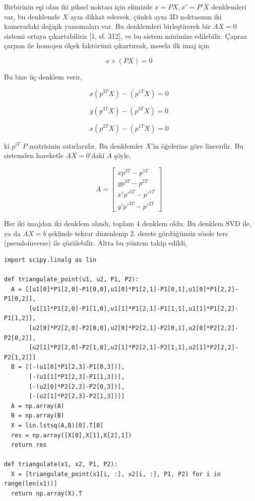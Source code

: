 \documentclass[12pt,fleqn]{article}\usepackage{../../common}
\begin{document}
Birbirinin eşi olan iki piksel noktası için elimizde $x = PX, x' = P'X$
denklemleri var, bu denklemde $X$ aynı dikkat edersek, çünkü aynı 3D
noktasının iki kameradaki değişik yansımaları var. Bu denklemleri
birleştirerek bir $AX=0$ sistemi ortaya çıkartabiliriz [1, sf. 312], ve bu
sistem minimize edilebilir. Çapraz çarpım ile homojen ölçek faktörünü
çıkartırsak, mesela ilk imaj için

$$ x \times (PX) = 0$$

Bu bize üç denklem verir, 

$$ x(p^{3T}X) - (p^{1T}X) = 0 $$

$$ y(p^{3T}X) - (p^{2T}X) = 0 $$

$$ x(p^{2T}X) - (p^{1T}X) = 0 $$

ki $p^{iT}$ $P$ matrisinin satırlarıdır. Bu denklemler $X$'in öğelerine göre
lineerdir. Bu sistemden hareketle $AX=0$'daki $A$ şöyle, 

$$ A = \left[\begin{array}{c}
xp^{3T} - p^{1T} \\ 
yp^{3T} - p^{2T} \\
x'p'^{3T} - p'^{1T} \\
y'p'^{3T} - p'^{2T} 
\end{array}\right]$$

Her iki imajdan iki denklem alındı, toplam 4 denklem oldu. Bu denklem SVD
ile, ya da $AX=b$ şeklinde tekrar düzenlenip 2. derste gördüğümüz sözde ters
(pseudoinverse) ile çözülebilir. Altta bu yöntem takip edildi,

\begin{verbatim}
import scipy.linalg as lin

def triangulate_point(u1, u2, P1, P2):
  A = [[u1[0]*P1[2,0]-P1[0,0],u1[0]*P1[2,1]-P1[0,1],u1[0]*P1[2,2]-P1[0,2]],
       [u1[1]*P1[2,0]-P1[1,0],u1[1]*P1[2,1]-P1[1,1],u1[1]*P1[2,2]-P1[1,2]],
       [u2[0]*P2[2,0]-P2[0,0],u2[0]*P2[2,1]-P2[0,1],u2[0]*P2[2,2]-P2[0,2]],
       [u2[1]*P2[2,0]-P2[1,0],u2[1]*P2[2,1]-P2[1,1],u2[1]*P2[2,2]-P2[1,2]]]
  B = [[-(u1[0]*P1[2,3]-P1[0,3])],
       [-(u1[1]*P1[2,3]-P1[1,3])],
       [-(u2[0]*P2[2,3]-P2[0,3])],
       [-(u2[1]*P2[2,3]-P2[1,3])]]
  A = np.array(A)
  B = np.array(B)
  X = lin.lstsq(A,B)[0].T[0]
  res = np.array([X[0],X[1],X[2],1])
  return res

def triangulate(x1, x2, P1, P2):
  X = [triangulate_point(x1[i, :], x2[i, :], P1, P2) for i in range(len(x1))]
  return np.array(X).T
\end{verbatim}
\end{document}
